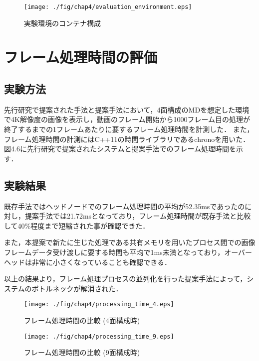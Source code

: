 \begin{figure}[H]
    \hspace*{\fill}
    \texttt{[image: ./fig/chap4/evaluation\_environment.eps]}
    \hspace*{\fill}
    \caption{実験環境のコンテナ構成}
   \end{figure}

\section{フレーム処理時間の評価}

\subsection{実験方法}
先行研究で提案された手法と提案手法において，4面構成のMDを想定した環境で4K解像度の画像を表示し，動画のフレーム開始から1000フレーム目の処理が終了するまでの1フレームあたりに要するフレーム処理時間を計測した．
また，フレーム処理時間の計測にはC++11の時間ライブラリであるchronoを用いた．
図4.6に先行研究で提案されたシステムと提案手法でのフレーム処理時間を示す．

\subsection{実験結果}

既存手法ではヘッドノードでのフレーム処理時間の平均が52.35msであったのに対し，提案手法では21.72msとなっており，フレーム処理時間が既存手法と比較して40\%程度まで短縮された事が確認できた．

また，本提案で新たに生じた処理である共有メモリを用いたプロセス間での画像フレームデータ受け渡しに要する時間も平均で1ms未満となっており，オーバーヘッドは非常に小さくなっていることも確認できる．

以上の結果より，フレーム処理プロセスの並列化を行った提案手法によって，システムのボトルネックが解消された．

\begin{figure}[H]
    \hspace*{\fill}
    \texttt{[image: ./fig/chap4/processing\_time\_4.eps]}
    \hspace*{\fill}
    \caption{フレーム処理時間の比較 (4面構成時)}
\end{figure}

\begin{figure}[H]
    \hspace*{\fill}
    \texttt{[image: ./fig/chap4/processing\_time\_9.eps]}
    \hspace*{\fill}
    \caption{フレーム処理時間の比較 (9面構成時)}
\end{figure}


